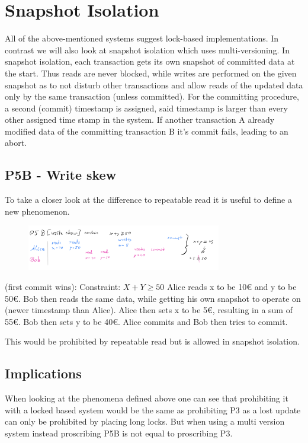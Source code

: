 \documentclass[sigconf, review=true]{acmart}
\begin{document}
\section{Snapshot Isolation}
All of the above-mentioned systems suggest lock-based implementations. In contrast we will also look at
snapshot isolation which uses multi-versioning.
In snapshot isolation, each transaction gets its own snapshot of committed data at the start.
Thus reads are never blocked, while writes are performed on the given snapshot as to not disturb
other transactions and allow reads of the updated data only by the same transaction (unless committed).
For the committing procedure, a second (commit) timestamp is assigned, said timestamp is larger than every
other assigned time stamp in the system. If another transaction A already modified data of the committing
transaction B it's commit fails, leading to an abort.
\subsection{P5B - Write skew}
To take a closer look at the difference to repeatable read it is useful to define a new phenomenon.

\begin{figure}[h]
    
    \includegraphics[width=8.5cm]{P5}
    
    \end{figure}
\begin{example}
    (first commit wins):
    Constraint: $ X+Y \geq  50$
    Alice reads x to be 10€ and y to be 50€. Bob then reads the same data, while getting his own snapshot
    to operate on (newer timestamp than Alice). Alice then sets x to be 5€,
    resulting in a sum of 55€. Bob then sets y to be 40€. Alice commits and Bob then tries to commit.
\end{example}
This would be prohibited by repeatable read but is allowed in snapshot isolation.
\subsection{Implications}
When looking at the phenomena defined above one can see that prohibiting it with a locked based system
would be the same as prohibiting P3 as a lost update can only be prohibited by placing long locks.
But when using a multi version system instead proscribing P5B is not equal to proscribing P3.
\end{document}
